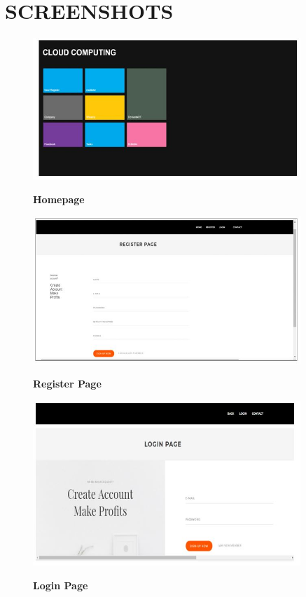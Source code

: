 \documentclass[BTech]{srmuthesis}
\begin{document}
\chapter{SCREENSHOTS}

\begin{figure}[H]
\centering
\includegraphics[width=0.9\textwidth]{homepage.jpg}
\label{Figure:10} \hspace{10mm}
\caption{\textbf{Homepage}}
\end{figure}

\begin{figure}[H]
\centering
\includegraphics[width=0.9\textwidth]{registerpage.jpg}
\label{Figure:10} \hspace{10mm}
\caption{\textbf{Register Page}}
\end{figure}

\begin{figure}[H]
\centering
\includegraphics[width=0.9\textwidth]{loginpage.jpg}
\label{Figure:10} \hspace{10mm}
\caption{\textbf{Login Page}}
\end{figure}
\end{document}
